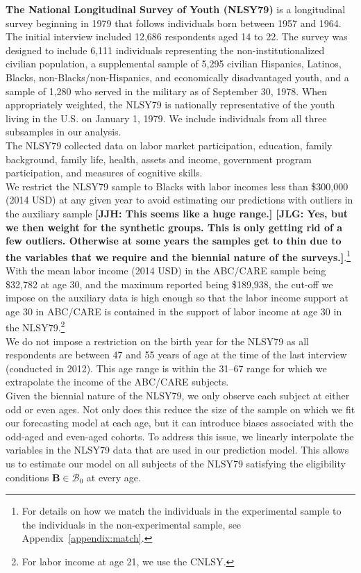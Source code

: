 \noindent\textbf{The National Longitudinal Survey of Youth (NLSY79)} is a longitudinal survey beginning in 1979 that follows individuals born between 1957 and 1964. The initial interview included 12,686 respondents aged 14 to 22. The survey was designed to include 6,111 individuals representing the non-institutionalized civilian population, a supplemental sample of 5,295 civilian Hispanics, Latinos, Blacks, non-Blacks/non-Hispanics, and economically disadvantaged youth, and a sample of 1,280 who served in the military as of September 30, 1978. When appropriately weighted, the NLSY79 is nationally representative of the youth living in the U.S. on January 1, 1979. We include individuals from all three subsamples in our analysis.\\

\noindent The NLSY79 collected data on labor market participation, education, family background, family life, health, assets and income, government program participation, and measures of cognitive skills.\\

\noindent We restrict the NLSY79 sample to Blacks with labor incomes less than \$300,000 (2014 USD) at any given year to avoid estimating our predictions with outliers in the auxiliary sample \textbf{[JJH: This seems like a huge range.] [JLG: Yes, but we then weight for the synthetic groups. This is only getting rid of a few outliers. Otherwise at some years the samples get to thin due to the variables that we require and the biennial nature of the surveys.]}.\footnote{For details on how we match the individuals in the experimental sample to the individuals in the non-experimental sample, see Appendix~\ref{appendix:match}.} With the mean labor income (2014 USD) in the ABC/CARE sample being \$32,782 at age 30, and the maximum reported being \$189,938, the cut-off we impose on the auxiliary data is high enough so that the labor income support at age 30 in ABC/CARE is contained in the support of labor income at age 30 in the NLSY79.\footnote{For labor income at age 21, we use the CNLSY.}\\

\noindent We do not impose a restriction on the birth year for the NLSY79 as all respondents are between 47 and 55 years of age at the time of the last interview (conducted in 2012). This age range is within the 31--67 range for which we extrapolate the income of the ABC/CARE subjects.\\

\noindent Given the biennial nature of the NLSY79, we only observe each subject at either odd or even ages. Not only does this reduce the size of the sample on which we fit our forecasting model at each age, but it can introduce biases associated with the odd-aged and even-aged cohorts. To address this issue, we linearly interpolate the variables in the NLSY79 data that are used in our prediction model. This allows us to estimate our model on all subjects of the NLSY79 satisfying the eligibility conditions $\bm{B}\in\mathcal{B}_0$ at every age.\\

